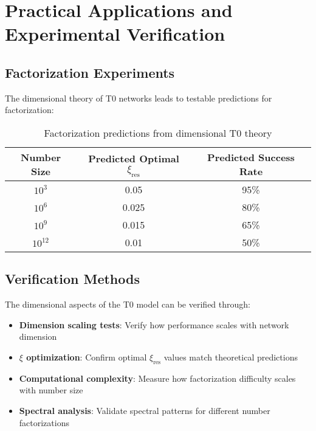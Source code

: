 \documentclass[12pt,a4paper]{article}
\newcommand{\xipar}{\ensuremath{\xi}}
\begin{document}
	\section{Practical Applications and Experimental Verification}
	\label{sec:practical_applications}
	
	\subsection{Factorization Experiments}
	\label{subsec:factorization_experiments}
	
	The dimensional theory of T0 networks leads to testable predictions for factorization:
	
	\begin{table}[htbp]
		\centering
		\begin{tabular}{ccc}
			\toprule
			\textbf{Number Size} & \textbf{Predicted Optimal $\xipar_{\text{res}}$} & \textbf{Predicted Success Rate} \\
			\midrule
			$10^3$ & 0.05 & 95\% \\
			$10^6$ & 0.025 & 80\% \\
			$10^9$ & 0.015 & 65\% \\
			$10^{12}$ & 0.01 & 50\% \\
			\bottomrule
		\end{tabular}
		\caption{Factorization predictions from dimensional T0 theory}
		\label{tab:factorization_predictions}
	\end{table}
	
	\subsection{Verification Methods}
	\label{subsec:verification_methods}
	
	The dimensional aspects of the T0 model can be verified through:
	
	\begin{itemize}
		\item \textbf{Dimension scaling tests}: Verify how performance scales with network dimension
		\item \textbf{$\xipar$ optimization}: Confirm optimal $\xipar_{\text{res}}$ values match theoretical predictions
		\item \textbf{Computational complexity}: Measure how factorization difficulty scales with number size
		\item \textbf{Spectral analysis}: Validate spectral patterns for different number factorizations
	\end{itemize}
	
\end{document}
